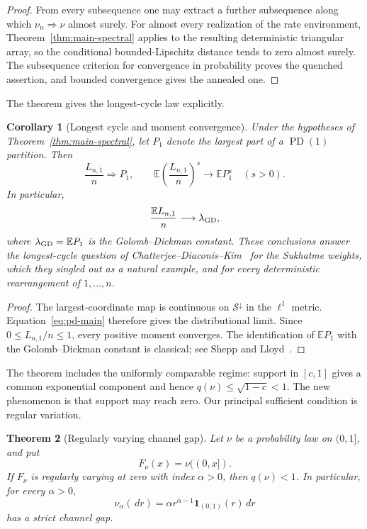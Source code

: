 \documentclass[11pt]{article}
\newtheorem{theorem}{Theorem}[section]
\newtheorem{corollary}[theorem]{Corollary}
\theoremstyle{definition}
\theoremstyle{remark}
\newcommand{\Ee}{\mathbb E}
\newcommand{\PD}{\operatorname{PD}}
\newcommand{\one}{\mathbf 1}
\newcommand{\dd}{\,d}
\newcommand{\cS}{\mathcal S}
\begin{document}
\begin{proof}
From every subsequence one may extract a further subsequence along which
$\nu_n\Rightarrow\nu$ almost surely.  For almost every realization of the rate
environment, Theorem~\ref{thm:main-spectral} applies to the resulting
deterministic triangular array, so the conditional bounded-Lipschitz distance
tends to zero almost surely.  The subsequence criterion for convergence in
probability proves the quenched assertion, and bounded convergence gives the
annealed one.
\end{proof}

The theorem gives the longest-cycle law explicitly.

\begin{corollary}[Longest cycle and moment convergence]
\label{cor:longest-cycle}
Under the hypotheses of Theorem~\ref{thm:main-spectral}, let $P_1$ denote the
largest part of a $\PD(1)$ partition.  Then
\begin{equation}
  \frac{L_{n,1}}n\Rightarrow P_1,
  \qquad
  \Ee\left(\frac{L_{n,1}}n\right)^s\longrightarrow\Ee P_1^s
  \quad(s>0).
  \label{eq:longest-cycle}
\end{equation}
In particular,
\[
  \frac{\Ee L_{n,1}}n\longrightarrow\lambda_{\rm GD},
\]
where $\lambda_{\rm GD}=\Ee P_1$ is the Golomb--Dickman constant.  These
conclusions answer the longest-cycle question of
Chatterjee--Diaconis--Kim~\cite{CDK2024} for the Sukhatme weights, which they
singled out as a natural example, and for every deterministic rearrangement
of $1,\ldots,n$.
\end{corollary}

\begin{proof}
The largest-coordinate map is continuous on $\cS^\downarrow$ in the
$\ell^1$ metric.  Equation~\eqref{eq:pd-main} therefore gives the distributional
limit.  Since $0\le L_{n,1}/n\le1$, every positive moment converges.  The
identification of $\Ee P_1$ with the Golomb--Dickman constant is classical;
see Shepp and Lloyd~\cite{SheppLloyd1966}.
\end{proof}

The theorem includes the uniformly comparable regime: support in $[c,1]$
gives a common exponential component and hence
$q(\nu)\le\sqrt{1-c}<1$.  The new phenomenon is that support may reach zero.
Our principal sufficient condition is regular variation.

\begin{theorem}[Regularly varying channel gap]
\label{thm:rv-gap}
Let $\nu$ be a probability law on $(0,1]$, and put
\[
 F_\nu(x)=\nu((0,x]).
\]
If $F_\nu$ is regularly varying at zero with index $\alpha>0$, then
$q(\nu)<1$.  In particular, for every $\alpha>0$,
\begin{equation}
  \nu_\alpha(\dd r)=\alpha r^{\alpha-1}\one_{(0,1)}(r)\dd r
  \label{eq:power-law-law}
\end{equation}
has a strict channel gap.
\end{theorem}
\end{document}
